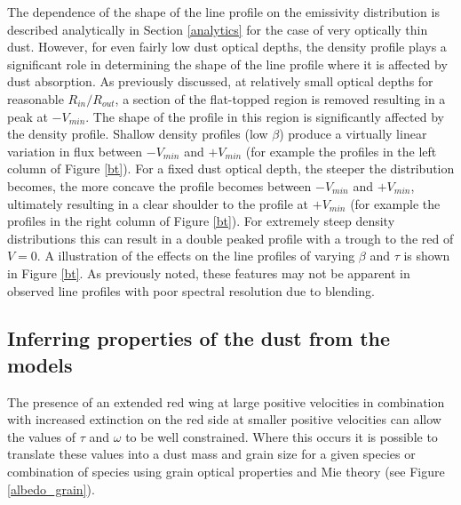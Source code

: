 \documentclass[useAMS,usenatbib,usegraphicx]{mnras}
\begin{document}
The dependence of the shape of the line profile on the emissivity distribution
is described analytically in Section \ref{analytics} for the case of very optically thin dust.  However, for even fairly low dust optical depths, the density profile  plays a significant role in determining the shape of the line profile where it is affected by dust absorption.  As previously discussed, at relatively small optical depths for reasonable $R_{in}/R_{out}$, 
a section of the flat-topped region is removed resulting in a peak at 
$-V_{min}$.  The shape of the profile in this region is significantly 
affected by the density profile.  Shallow density profiles (low $\beta$) produce a virtually 
linear variation in flux between $-V_{min}$ and $+V_{min}$ (for example the profiles in the left column of Figure \ref{bt}).  For a fixed dust
optical depth, the steeper the distribution becomes, the more concave the 
profile becomes between $-V_{min}$ and $+V_{min}$, ultimately resulting in 
a clear shoulder to the profile at $+V_{min}$  (for example the profiles in the right column of Figure \ref{bt}).  For extremely steep density
distributions this can result in a double peaked profile with 
a trough to the red of $V=0$.  A illustration of the effects on the line profiles of varying $\beta$ and $\tau$  is shown in Figure \ref{bt}.  As previously noted, these features may not be apparent in observed line profiles with poor spectral resolution due to blending.

\subsection{Inferring properties of the dust from the models}





The presence of an extended red wing at large positive velocities in 
combination with increased extinction on the red side at smaller positive 
velocities can allow the values of $\tau$ and $\omega$ to be well 
constrained.  Where this occurs it is possible to translate these values into a 
dust mass and grain size for a given species or combination of 
species using grain optical properties and Mie theory (see Figure 
\ref{albedo_grain}).  
\end{document}
